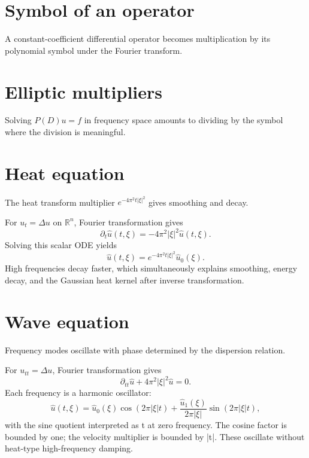 \section{Symbol of an operator}
A constant-coefficient differential operator becomes multiplication by its polynomial symbol under the Fourier transform.

\section{Elliptic multipliers}
Solving $P(D)u=f$ in frequency space amounts to dividing by the symbol where the division is meaningful.

\section{Heat equation}
The heat transform multiplier $e^{-4\pi^2t|\xi|^2}$ gives smoothing and decay.


\begin{example}\label{ex:iii28-expand-01}
For \(u_t=\Delta u\) on \(\mathbb R^n\), Fourier transformation gives
\[
\partial_t\widehat u(t,\xi)
=-4\pi^2|\xi|^2\widehat u(t,\xi).
\]
Solving this scalar ODE yields
\[
\widehat u(t,\xi)
=e^{-4\pi^2t|\xi|^2}\widehat u_0(\xi).
\]
High frequencies decay faster, which simultaneously explains smoothing,
energy decay, and the Gaussian heat kernel after inverse transformation.
\end{example}
\section{Wave equation}
Frequency modes oscillate with phase determined by the dispersion relation.


\begin{example}\label{ex:iii28-expand-02}
For \(u_{tt}=\Delta u\), Fourier transformation gives
\[
\partial_{tt}\widehat u+4\pi^2|\xi|^2\widehat u=0.
\]
Each frequency is a harmonic oscillator:
\[
\widehat u(t,\xi)
=\widehat u_0(\xi)\cos(2\pi|\xi|t)
+\frac{\widehat u_1(\xi)}{2\pi|\xi|}
\sin(2\pi|\xi|t),
\]
with the sine quotient interpreted as t at zero frequency. The cosine factor is bounded by one; the velocity multiplier is bounded by |t|. These oscillate without heat-type high-frequency damping.
\end{example}
